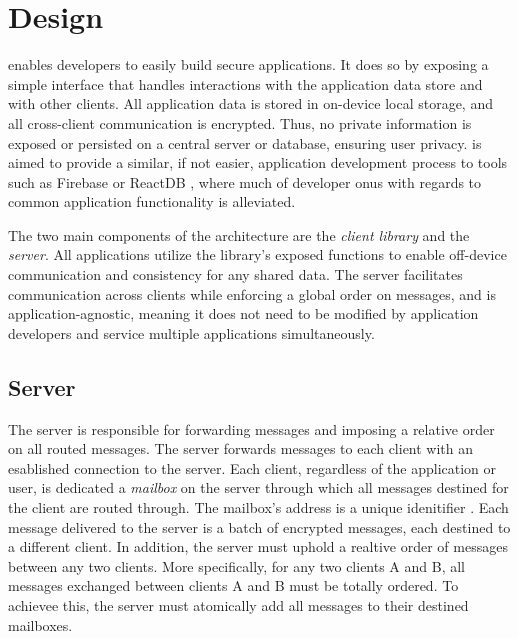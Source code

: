 \section{Design}

\name{} enables developers to easily build secure applications. It does
so by exposing a simple interface that handles interactions with the
application data store and with other clients. All application data is 
stored in on-device local storage, and all cross-client communication is
encrypted. Thus, no private information is exposed or persisted on a 
central server or database, ensuring user privacy. \name{} is aimed to provide a similar, if not easier, application development process to tools such as Firebase  or ReactDB \tocite{}, where much of developer onus with regards to common application functionality is alleviated.

The two main components of the \name{} architecture are the 
\textit{client library} and the \textit{\name{} server}. All \name{} 
applications utilize the library's exposed functions to enable 
off-device communication and consistency for any shared data. The server
facilitates communication across clients while enforcing a global order 
on messages, and is application-agnostic, meaning it does not need to be 
modified by application developers and service multiple applications 
simultaneously. 


\subsection{Server}
The server is responsible for forwarding messages and imposing a relative 
order on all routed messages. The server forwards messages to each client
with an esablished connection to the server. Each client, regardless of the
application or user, is dedicated a \textit{mailbox} on the server through 
which all messages destined for the client are routed through. The mailbox's
address is a unique idenitifier . Each message delivered to the server is a batch of encrypted messages,
each destined to a different client. 
In addition, the server must uphold a realtive order of messages between any
two clients. More specifically, for any two clients A and B, all messages 
exchanged between clients A and B must be totally ordered. To achievee this,
the server must atomically add all messages to their destined mailboxes. 

